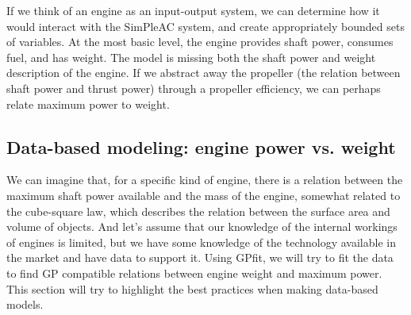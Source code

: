 If we think of an engine as an input-output system, we can determine how it
would interact with the SimPleAC system, and create appropriately bounded
sets of variables.
At the most basic level, the engine provides shaft power, consumes fuel, 
and has weight. The model is missing both the shaft power and weight description
of the engine. If we abstract away the propeller (the relation between shaft
power and thrust power) through a propeller efficiency,
we can perhaps relate maximum power to weight.

\subsection{Data-based modeling: engine power vs. weight}
\label{s:datafit}

We can imagine that, for a specific kind of engine, there is a relation between the 
maximum shaft power available and the mass of the engine, somewhat related to the 
cube-square law, which describes the relation between the surface area and volume 
of objects. And let's assume that our knowledge of the internal workings of engines
is limited, but we have some knowledge of the technology available in the market
and have data to support it. Using GPfit, we will try to fit the data to find
\gls{GP} compatible relations between engine weight and maximum power. This section
will try to highlight the best practices when making data-based models. 

